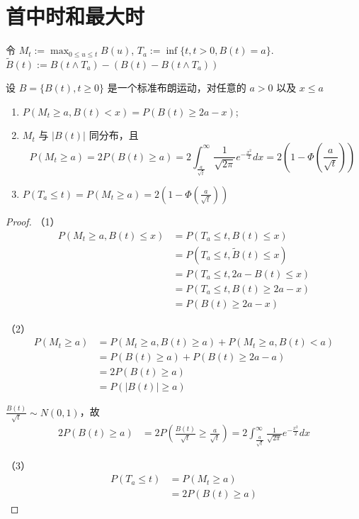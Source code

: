 \documentclass[lang=cn,10pt,thmcnt=section]{elegantbook}
\begin{document}
\section{首中时和最大时}
令 $M_t := \max_{0 \leq u \leq t} B(u)$, $T_a := \inf\{t, t > 0, B(t) = a\}$. $\tilde{B}(t) := B(t \wedge T_a) - (B(t) - B(t \wedge T_a))$
\begin{theorem}
	设 $B = \{B(t), t \geq 0\}$ 是一个标准布朗运动，对任意的 $a > 0$ 以及 $x \leq a$
\begin{enumerate}
    \item $P(M_t \geq a, B(t) < x) = P(B(t) \geq 2a - x)$;
    \item $M_t$ 与 $|B(t)|$ 同分布，且
    \[
    P(M_t \geq a) = 2P(B(t) \geq a) = 2 \int_{\frac{a}{\sqrt{t}}}^{\infty} \frac{1}{\sqrt{2\pi}} e^{-\frac{x^2}{2}} dx = 2(1 - \Phi(\frac{a}{\sqrt{t}}))
    \]
    \item $P(T_a \leq t) = P(M_t \geq a) = 2(1 - \Phi(\frac{a}{\sqrt{t}}))$
\end{enumerate}
\end{theorem}
\begin{proof}
	（1）\begin{align*}
		P(M_t \geq a, B(t) \leq x) &= P(T_a \leq t, B(t) \leq x) \\
		&= P(T_a \leq t, \tilde{B}(t) \leq x) \\
		&= P(T_a \leq t, 2a - B(t) \leq x) \\
		&= P(T_a \leq t, B(t) \geq 2a - x) \\
		&= P(B(t) \geq 2a - x)
		\end{align*}
	
	（2）\begin{align*}
		P(M_t \geq a) &= P(M_t \geq a, B(t) \geq a) + P(M_t \geq a, B(t) < a) \\
		&= P(B(t) \geq a) + P(B(t) \geq 2a - a) \\
		&= 2P(B(t) \geq a) \\
		&= P(|B(t)| \geq a)
		\end{align*}
		
		 $\frac{B(t)}{\sqrt{t}} \sim N(0, 1)$，故
		\begin{align*}
		2P(B(t) \geq a) &= 2P\left(\frac{B(t)}{\sqrt{t}} \geq \frac{a}{\sqrt{t}}\right) = 2 \int_{\frac{a}{\sqrt{t}}}^{\infty} \frac{1}{\sqrt{2\pi}} e^{-\frac{x^2}{2}} dx
		\end{align*}

	（3）\begin{align*}
		P(T_a \leq t) &= P(M_t \geq a) \\
		&= 2P(B(t) \geq a)
		\end{align*}
\end{proof}
\end{document}
